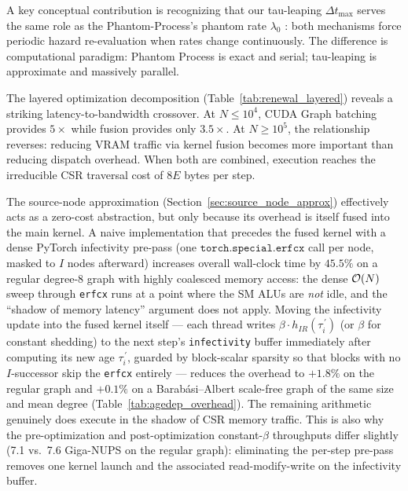 A key conceptual contribution is recognizing that our tau-leaping $\Delta t_{\max}$ serves the same role as the Phantom-Process's phantom rate $\lambda_0$ \citep{vajdi2020stochastic}: both mechanisms force periodic hazard re-evaluation when rates change continuously. The difference is computational paradigm: Phantom Process is exact and serial; tau-leaping is approximate and massively parallel.

The layered optimization decomposition (Table~\ref{tab:renewal_layered}) reveals a striking latency-to-bandwidth crossover. At $N \leq 10^4$, CUDA Graph batching provides $5\times$ while fusion provides only $3.5\times$. At $N \geq 10^5$, the relationship reverses: reducing VRAM traffic via kernel fusion becomes more important than reducing dispatch overhead. When both are combined, execution reaches the irreducible CSR traversal cost of $8E$ bytes per step.

The source-node approximation (Section~\ref{sec:source_node_approx}) effectively acts as a zero-cost abstraction, but only because its overhead is itself fused into the main kernel. A naive implementation that precedes the fused kernel with a dense PyTorch infectivity pre-pass (one $\texttt{torch.special.erfcx}$ call per node, masked to $I$ nodes afterward) increases overall wall-clock time by $45.5\%$ on a regular degree-8 graph with highly coalesced memory access: the dense $\mathcal{O}(N)$ sweep through \texttt{erfcx} runs at a point where the SM ALUs are \emph{not} idle, and the ``shadow of memory latency'' argument does not apply. Moving the infectivity update into the fused kernel itself --- each thread writes $\beta \cdot h_{IR}(\tau_i^{\,\prime})$ (or $\beta$ for constant shedding) to the next step's \texttt{infectivity} buffer immediately after computing its new age $\tau_i^{\,\prime}$, guarded by block-scalar sparsity so that blocks with no $I$-successor skip the \texttt{erfcx} entirely --- reduces the overhead to $+1.8\%$ on the regular graph and $+0.1\%$ on a Barab\'{a}si--Albert scale-free graph of the same size and mean degree (Table~\ref{tab:agedep_overhead}). The remaining arithmetic genuinely does execute in the shadow of CSR memory traffic. This is also why the pre-optimization and post-optimization constant-$\beta$ throughputs differ slightly (7.1 vs.\ 7.6 Giga-NUPS on the regular graph): eliminating the per-step pre-pass removes one kernel launch and the associated read-modify-write on the infectivity buffer.

